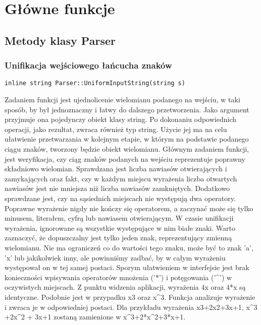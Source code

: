 \section{Główne funkcje}

\subsection{Metody klasy Parser}

\subsubsection{Unifikacja wejściowego łańcucha znaków}
\begin{lstlisting}
inline string Parser::UniformInputString(string s)
\end{lstlisting}

Zadaniem funkcji jest ujednolicenie wielomianu podanego na wejściu, w taki sposób, by był jednoznaczny i łatwy do dalszego przetworzenia. Jako argument przyjmuje ona pojedynczy obiekt klasy string. Po dokonaniu odpowiednich operacji, jako rezultat, zwraca również typ string. Użycie jej ma na celu ułatwienie przetwarzania w kolejnym etapie, w którym na podstawie podanego ciągu znaków, tworzony będzie obiekt wielomianu. Głównym zadaniem funkcji, jest weryfikacja, czy ciąg znaków podanych na wejściu reprezentuje poprawny składniowo wielomian. Sprawdzana jest liczba nawiasów otwierających i zamykających oraz fakt, czy w każdym miejscu wyrażenia liczba otwartych nawiasów jest nie mniejsza niż liczba nawiasów zamkniętych. Dodatkowo sprawdzane jest, czy na sąsiednich miejscach nie występują dwa operatory. Poprawne wyrażenie nigdy nie kończy się operatorem, a zaczynać może się tylko minusem, literałem, cyfrą lub nawiasem otwierającym. W czasie unifikacji wyrażenia, ignorowane są wszystkie występujące w nim białe znaki. Warto zaznaczyć, że dopuszczalny jest tylko jeden znak, reprezentujący zmienną wielomianu. Nie ma ograniczeń co do wartości tego znaku, może być to znak 'a', 'x' lub jakikolwiek inny, ale powinniśmy zadbać, by w całym wyrażeniu występował on w tej samej postaci. Sporym ułatwieniem w interfejsie jest brak konieczności wpisywania operatorów mnożenia ('*') i potęgowania ('\^{}') w oczywistych miejscach. Z punktu widzenia aplikacji, wyrażenia 4x oraz 4*x są identyczne. Podobnie jest w przypadku x3 oraz x\^{}3. Funkcja analizuje wyrażenie i zwraca je w odpowiedniej postaci. Dla przykładu wyrażenia x3+2x2+3x+1, x\^{}3 +2x\^{}2 + 3x+1 zostaną zamienione w x\^{}3+2*x\^{}2+3*x+1.

